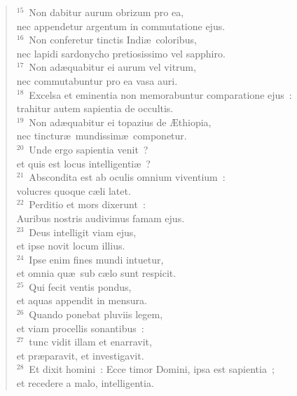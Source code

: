 \begin{flushleft}
\begin{verse}
${}^{15}$~Non dabitur aurum obrizum pro ea,\\ nec appendetur argentum in commutatione ejus.\\
${}^{16}$~Non conferetur tinctis Indi\ae\ coloribus,\\ nec lapidi sardonycho pretiosissimo vel sapphiro.\\
${}^{17}$~Non ad\ae quabitur ei aurum vel vitrum,\\ nec commutabuntur pro ea vasa auri.\\
${}^{18}$~Excelsa et eminentia non memorabuntur comparatione ejus~:\\ trahitur autem sapientia de occultis.\\
${}^{19}$~Non ad\ae quabitur ei topazius de \AE thiopia,\\ nec tinctur\ae\ mundissim\ae\ componetur.\\
${}^{20}$~Unde ergo sapientia venit~?\\ et quis est locus intelligenti\ae~?\\
${}^{21}$~Abscondita est ab oculis omnium viventium~:\\ volucres quoque c\ae li latet.\\
${}^{22}$~Perditio et mors dixerunt~:\\ Auribus nostris audivimus famam ejus.\\
${}^{23}$~Deus intelligit viam ejus,\\ et ipse novit locum illius.\\
${}^{24}$~Ipse enim fines mundi intuetur,\\ et omnia qu\ae\ sub c\ae lo sunt respicit.\\
${}^{25}$~Qui fecit ventis pondus,\\ et aquas appendit in mensura.\\
${}^{26}$~Quando ponebat pluviis legem,\\ et viam procellis sonantibus~:\\
${}^{27}$~tunc vidit illam et enarravit,\\ et pr\ae paravit, et investigavit.\\
${}^{28}$~Et dixit homini~: Ecce timor Domini, ipsa est sapientia~;\\ et recedere a malo, intelligentia.\end{verse}\end{flushleft}


